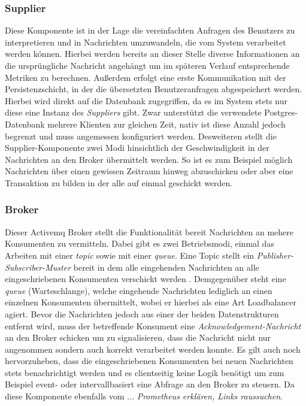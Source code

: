\subsubsection{Supplier}
Diese Komponente ist in der Lage die vereinfachten Anfragen des Benutzers zu interpretieren und in Nachrichten umzuwandeln, die vom System verarbeitet werden können. Hierbei werden bereits an dieser Stelle diverse Informationen an die ursprüngliche Nachricht angehängt um im späteren Verlauf entsprechende Metriken zu berechnen. Außerdem erfolgt eine erste Kommunikation mit der Persistenzschicht, in der die übersetzten Benutzeranfragen abgespeichert werden. Hierbei wird direkt auf die Datenbank zugegriffen, da es im System stets nur diese eine Instanz des \emph{Suppliers} gibt. Zwar unterstützt die verwendete Postgres-Datenbank mehrere Klienten zur gleichen Zeit, nativ ist diese Anzahl jedoch begrenzt und muss angemessen konfiguriert werden. Desweiteren stellt die Supplier-Komponente zwei Modi hinsichtlich der Geschwindigkeit in der Nachrichten an den Broker übermittelt werden. So ist es zum Beispiel möglich Nachrichten über einen gewissen Zeitraum hinweg abzuschicken oder aber eine Transaktion zu bilden in der alle auf einmal geschickt werden.


\subsubsection{Broker}
Dieser Activemq Broker stellt die Funktionalität bereit Nachrichten an mehere Konsumenten zu vermitteln. Dabei gibt es zwei Betriebsmodi, einmal das Arbeiten mit einer \emph{topic} sowie mit einer \emph{queue}. Eine Topic stellt ein \emph{Publisher-Subscriber-Muster} bereit in dem alle eingehenden Nachrichten an alle eingeschriebenen Konsumenten verschickt werden . Demgegenüber steht eine \emph{queue} (Warteschlange), welche eingehende Nachrichten lediglich an einen einzelnen Konsumenten übermittelt, wobei er hierbei als eine Art Loadbalancer agiert. Bevor die Nachrichten jedoch aus einer der beiden Datenstrukturen entfernt wird, muss der betreffende Konsument eine \emph{Acknowledgement-Nachricht} an den Broker schicken um zu signalisieren, dass die Nachricht nicht nur angenommen sondern auch korrekt verarbeitet werden konnte. Es gilt auch noch hervorzuheben, dass die eingeschriebenen Konsumenten bei neuen Nachrichten stets benachrichtigt werden und es clientseitig keine Logik benötigt um zum Beispiel event- oder intervallbasiert eine Abfrage an den Broker zu steuern. Da diese Komponente ebenfalls vom ... \emph{Prometheus erklären, Links raussuchen}. 



